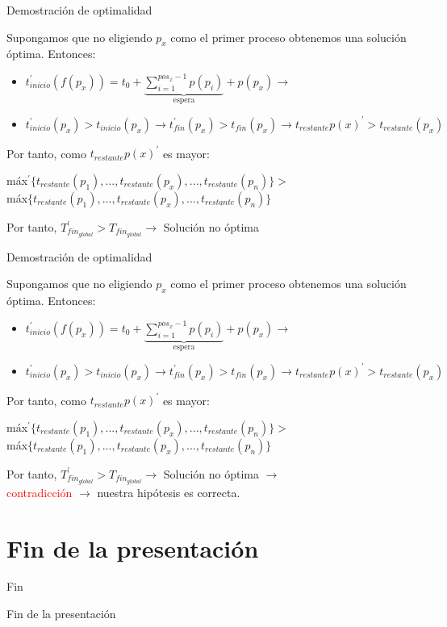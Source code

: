 \documentclass{beamer}
\begin{document}
\begin{frame}[fragile]{Demostración de optimalidad}

Supongamos que no eligiendo $p_x$ como el primer proceso obtenemos una solución óptima. Entonces:
\begin{itemize}
\item $t_{inicio}^{\prime}(f(p_x))= t_0 + 
\underbrace{\sum^{pos_x-1}_{i=1} p(p_i)}_{\text{espera}} + p(p_x) \rightarrow $

\item $t_{inicio}^{\prime}(p_x) > t_{inicio}(p_x) \rightarrow 
	t_{fin}^{\prime}(p_x) > t_{fin}(p_x) \rightarrow t_{restante}p(x)^{\prime} > t_{restante}(p_x)$
\end{itemize}

Por tanto, como $t_{restante}p(x)^{\prime}$ es mayor:
\begin{center}
máx$^{\prime}\{t_{restante}(p_1),...,t_{restante}(p_x),...,t_{restante}(p_n)\} > $ \\máx$\{t_{restante}(p_1),...,t_{restante}(p_x),...,t_{restante}(p_n)\}$
\end{center}
Por tanto, $T_{fin_{global}}^{\prime}> T_{fin_{global}} \rightarrow $ Solución no óptima
\end{frame}

\begin{frame}[fragile]{Demostración de optimalidad}

Supongamos que no eligiendo $p_x$ como el primer proceso obtenemos una solución óptima. Entonces:
\begin{itemize}
\item $t_{inicio}^{\prime}(f(p_x))= t_0 + 
\underbrace{\sum^{pos_x-1}_{i=1} p(p_i)}_{\text{espera}} + p(p_x) \rightarrow $

\item $t_{inicio}^{\prime}(p_x) > t_{inicio}(p_x) \rightarrow 
	t_{fin}^{\prime}(p_x) > t_{fin}(p_x) \rightarrow t_{restante}p(x)^{\prime} > t_{restante}(p_x)$
\end{itemize}

Por tanto, como $t_{restante}p(x)^{\prime}$ es mayor:
\begin{center}
máx$^{\prime}\{t_{restante}(p_1),...,t_{restante}(p_x),...,t_{restante}(p_n)\} > $ \\máx$\{t_{restante}(p_1),...,t_{restante}(p_x),...,t_{restante}(p_n)\}$
\end{center}
Por tanto, $T_{fin_{global}}^{\prime}> T_{fin_{global}} \rightarrow $ Solución no óptima $\rightarrow$\\ \textcolor{red}{contradicción} $\rightarrow$ nuestra hipótesis es correcta.
\end{frame}


\section*{Fin de la presentación}

\begin{frame}{Fin}
\begin{center}
\huge{Fin de la presentación}
\end{center}
\end{frame}
\end{document}
